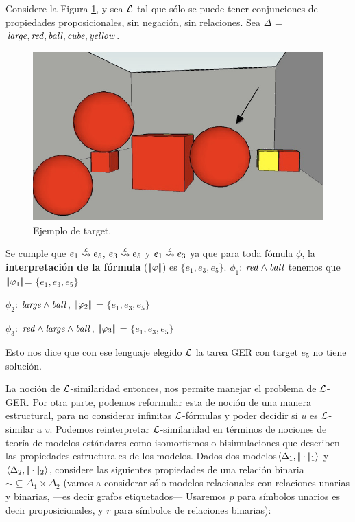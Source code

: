 Considere la Figura \ref{target_mapa_3ball}, y sea $\mathcal{L}$ tal que s\'olo se puede tener conjunciones de propiedades proposicionales, sin negaci\'on, sin relaciones. Sea $\Delta$ = ${\mathit{large}, \mathit{red}, \mathit{ball}, \mathit{cube}, \mathit{yellow}}$.
\begin{figure}[H]
\centering
\includegraphics[width=.6\textwidth]{images/22paraRelacional.jpg}
\caption{Ejemplo de target.}
\label{target_mapa_3ball}
\end{figure}



Se cumple que  $e_1 \simil{\+L} e_5$, $e_3 \simil{\+L} e_5$ y $e_1 \simil{\+L} e_3$ ya que para toda f\'omula $\phi$, la {\bf interpretaci\'on de la f\'ormula} ($|\!|\varphi|\!|$) es $\{e_1, e_3, e_5\}$. 
$\phi_1$: $\mathit{red} \land \mathit{ball}$ tenemos que $|\!|\varphi_1|\!| $= $\{e_1, e_3, e_5\}$

$\phi_2$: $\mathit{large} \land \mathit{ball}$, $|\!|\varphi_2|\!| $ = $\{e_1, e_3, e_5\}$

$\phi_3$: $\mathit{red} \land \mathit{large} \land \mathit{ball}$, $|\!|\varphi_3|\!|$ = $\{e_1, e_3, e_5\}$

Esto nos dice que con ese lenguaje elegido $\mathcal{L}$ la tarea GER con target $e_5$ no tiene soluci\'on.

La noci\'on de $\mathcal{L}$-similaridad entonces, nos permite manejar el problema de  $\mathcal{L}$-GER.
Por otra parte, podemos reformular esta de noci\'on de una manera estructural, para no considerar infinitas $\mathcal{L}$-f\'ormulas y poder decidir si $u$ es $\mathcal{L}$-similar a $v$. Podemos reinterpretar $\mathcal{L}$-similaridad en t\'erminos de nociones de teor\'ia de modelos est\'andares
como isomorfismos o bisimulaciones que describen las propiedades estructurales de los modelos. Dados dos modelos$\langle \Delta_1, |\!|\cdot|\!|_1 \rangle$ y $\langle \Delta_2,
|\!|\cdot|\!|_2 \rangle$, considere las siguientes
propiedades de una relaci\'on binaria ${\sim} \subseteq \Delta_1 \times \Delta_2$ 
(vamos a considerar s\'olo modelos relacionales con relaciones unarias y binarias, ---es decir grafos etiquetados--- Usaremos $p$ para s\'imbolos unarios es decir proposicionales, y $r$ para s\'imbolos de relaciones binarias):
\smallskip 

